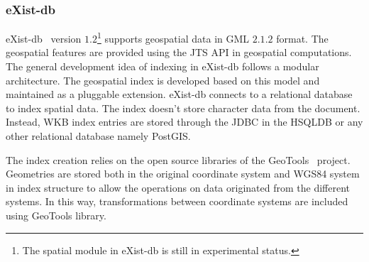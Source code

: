 \documentclass[a4paper,12pt]{article}
\begin{document}
\subsubsection{eXist-db}

eXist-db~\cite{existdb} version $1.2$\footnote{The spatial module in eXist-db is still in experimental status.} supports geospatial data in GML $2.1.2$ format. The geospatial features are provided using the JTS API in geospatial computations. 
The general development idea of indexing in eXist-db follows a modular architecture.
The geospatial index is developed based on this model and maintained as a pluggable extension. 
eXist-db connects to a relational database to index spatial data. The index doesn't store character data from the document. Instead, WKB index entries are stored through the JDBC in the HSQLDB or any other relational database namely PostGIS. 

The index creation relies on the open source libraries of the GeoTools~\cite{geotools} project. Geometries are stored both in the original coordinate system and WGS84 system in index structure to allow the operations on data originated from the different systems. In this way, transformations between coordinate systems are included using GeoTools library.
 
\end{document}
